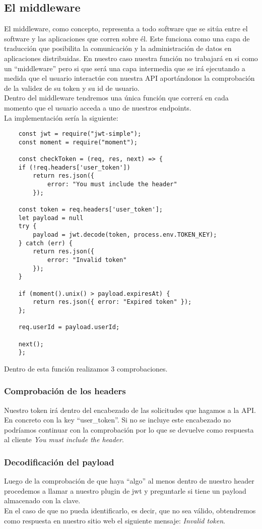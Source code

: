 \subsection{El middleware}
El middleware, como concepto, representa a todo software que se sitúa entre el software y las aplicaciones que corren sobre él. Este funciona como una capa de traducción que posibilita la comunicación y la administración de datos en aplicaciones distribuidas. En nuestro caso nuestra función no trabajará en si como un ``middleware'' pero si que será una capa intermedia que se irá ejecutando a medida que el usuario interactúe con nuestra API aportándonos la comprobación de la validez de su token y su id de usuario.
\\Dentro del middleware tendremos una única función que correrá en cada momento que el usuario acceda a uno de nuestros endpoints.
\\La implementación sería la siguiente:
\begin{verbatim}
    const jwt = require("jwt-simple");
    const moment = require("moment");

    const checkToken = (req, res, next) => {
    if (!req.headers['user_token'])
        return res.json({
            error: "You must include the header"
        });

    const token = req.headers['user_token'];
    let payload = null
    try {
        payload = jwt.decode(token, process.env.TOKEN_KEY);
    } catch (err) {
        return res.json({
            error: "Invalid token"
        });
    }

    if (moment().unix() > payload.expiresAt) {
        return res.json({ error: "Expired token" });
    };

    req.userId = payload.userId;

    next();
    };
\end{verbatim}
Dentro de esta función realizamos 3 comprobaciones.

\subsubsection{Comprobación de los headers}
Nuestro token irá dentro del encabezado de las solicitudes que hagamos a la API. En concreto con la key ``user\_token''. Si no se incluye este encabezado no podríamos continuar con la comprobación por lo que se devuelve como respuesta al cliente \textit{You must include the header}.

\subsubsection{Decodificación del payload}
Luego de la comprobación de que haya ``algo'' al menos dentro de nuestro header procedemos a llamar a nuestro plugin de jwt y preguntarle si tiene un payload almacenado con la clave.
\\En el caso de que no pueda identificarlo, es decir, que no sea válido, obtendremos como respuesta en nuestro sitio web el siguiente mensaje: \textit{Invalid token}.

